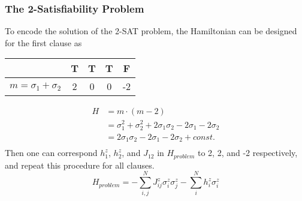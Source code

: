 \documentclass{beamer}
\begin{document}
\begin{frame}
	\frametitle{The 2-Satisfiability Problem}
	
	To encode the solution of the 2-SAT problem, the Hamiltonian can be designed for the first clause as 
	\begin{center}
		\begin{tabular}{|c|c|c|c|c|}
			
			\hline
			& T & T & T & F \\
			\hline
			\hline
			$m=\sigma_1+\sigma_2$ & 2 & 0 & 0 & -2 \\
			\hline
		\end{tabular} 
	\end{center}
	\begin{equation*}
	\begin{split}
	H & = m \cdot (m-2)\\
	& = \sigma_1^2 + \sigma_2^2 + 2\sigma_1 \sigma_2 -2\sigma_1 -2\sigma_2\\
	& = 2\sigma_1 \sigma_2 -2\sigma_1 -2\sigma_2 + const.\\
	\end{split}
	\end{equation*}
	Then one can correspond $h_1^z$, $h_2^z$, and $J_{12}$ in $H_{problem}$ to 2, 2, and -2 respectively, and repeat this procedure for all clauses. 
	\begin{equation*}
	H_{problem}= -\sum_{i,j}^N J_{ij}^z \sigma^z_i \sigma^z_j - \sum_{i}^N h_i^z \sigma^z_i
	\end{equation*} 
	
	
\end{frame}

\end{document}
